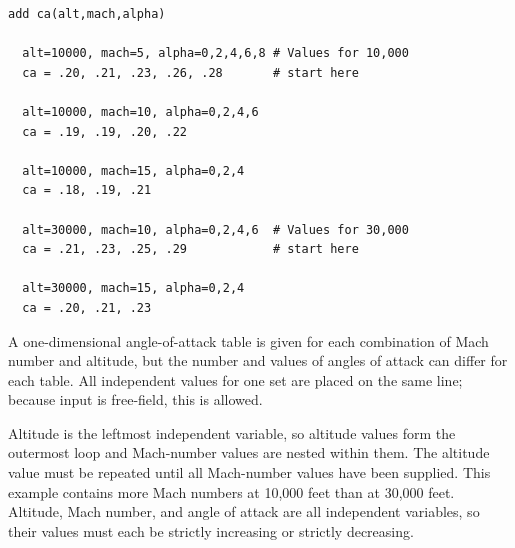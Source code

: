 \begin{lstlisting}[style=taosmanual]
add ca(alt,mach,alpha)

  alt=10000, mach=5, alpha=0,2,4,6,8 # Values for 10,000
  ca = .20, .21, .23, .26, .28       # start here

  alt=10000, mach=10, alpha=0,2,4,6
  ca = .19, .19, .20, .22

  alt=10000, mach=15, alpha=0,2,4
  ca = .18, .19, .21

  alt=30000, mach=10, alpha=0,2,4,6  # Values for 30,000
  ca = .21, .23, .25, .29            # start here

  alt=30000, mach=15, alpha=0,2,4
  ca = .20, .21, .23
\end{lstlisting}

A one-dimensional angle-of-attack table is given for each combination of Mach
number and altitude, but the number and values of angles of attack can differ for
each table. All independent values for one set are placed on the same line; because
input is free-field, this is allowed.

Altitude is the leftmost independent variable, so altitude values form the outermost
loop and Mach-number values are nested within them. The altitude value must be
repeated until all Mach-number values have been supplied. This example contains
more Mach numbers at 10,000 feet than at 30,000 feet. Altitude, Mach number, and
angle of attack are all independent variables, so their values must each be strictly
increasing or strictly decreasing.
